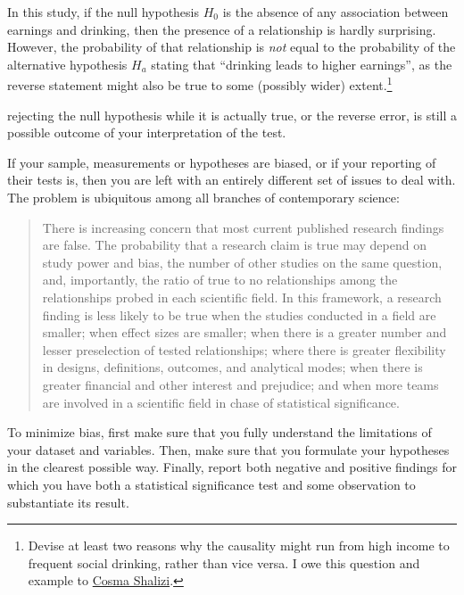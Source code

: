 In this study, if the null hypothesis $H_0$ is the absence of any association between earnings and drinking, then the presence of a relationship is hardly surprising. However, the probability of that relationship is \emph{not} equal to the probability of the alternative hypothesis $H_a$ stating that ``drinking leads to higher earnings'', as the reverse statement might also be true to some (possibly wider) extent.\footnote{Devise at least two reasons why the causality might run from high income to frequent social drinking, rather than vice versa. I owe this question and example to \href{https://pinboard.in/u:cshalizi/b:d54b8c984beb}{Cosma Shalizi}.}

 rejecting the null hypothesis while it is actually true, or the reverse error, is still a possible outcome of your interpretation of the test. 

 If your sample, measurements or hypotheses are biased, or if your reporting of their tests is, then you are left with an entirely different set of issues to deal with. The problem is ubiquitous among all branches of contemporary science:

\begin{quote}
There is increasing concern that most current published research findings are false. The probability that a research claim is true may depend on study power and bias, the number of other studies on the same question, and, importantly, the ratio of true to no relationships among the relationships probed in each scientific field. In this framework, a research finding is less likely to be true when the studies conducted in a field are smaller; when effect sizes are smaller; when there is a greater number and lesser preselection of tested relationships; where there is greater flexibility in designs, definitions, outcomes, and analytical modes; when there is greater financial and other interest and prejudice; and when more teams are involved in a scientific field in chase of statistical significance\cite{Ioannidis:2005u}.
\end{quote}

To minimize bias, first make sure that you fully understand the limitations of your dataset and variables. Then, make sure that you formulate your hypotheses in the clearest possible way. Finally, report both negative and positive findings for which you have both a statistical significance test and some observation to substantiate its result.


%
%
%
%
%
%
